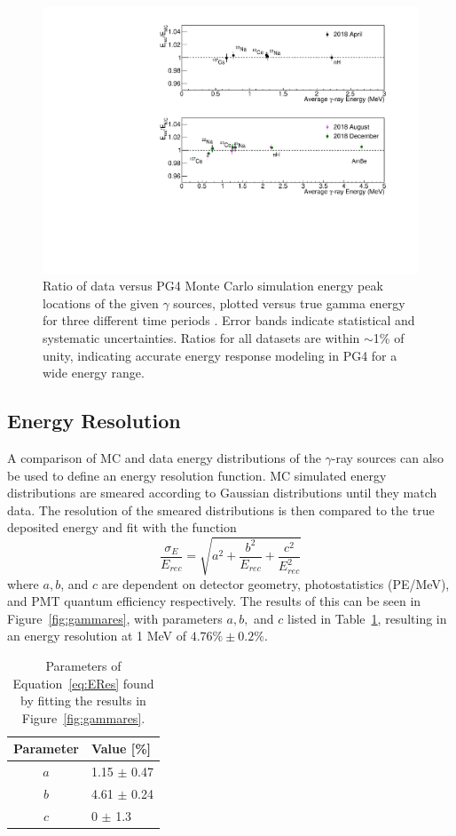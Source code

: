 \begin{figure}[h]
	\centering
	\includegraphics[width=0.7\linewidth]{tex/5-analysis-images/GammaScale}
	\caption[MC-data reconstructed energy peak ratio for $\gamma$ sources]{Ratio of data versus PG4 Monte Carlo simulation energy peak locations of the given $\gamma$ sources, plotted versus true gamma energy for three different time periods \cite{XZhang:2815}. Error bands indicate statistical and systematic uncertainties. Ratios for all datasets are within $\sim$1\% of unity, indicating accurate energy response modeling in PG4 for a wide energy range.}
	\label{fig:gammascale}
\end{figure}

\subsection{Energy Resolution}

A comparison of MC and data energy distributions of the $\gamma$-ray sources can also be used to define an energy resolution function. 
MC simulated energy distributions are smeared according to Gaussian distributions until they match data. 
The resolution of the smeared distributions is then compared to the true deposited energy and fit with the function
\begin{equation}
	\frac{\sigma_E}{E_{rec}} = \sqrt{a^2 + \frac{b^2}{E_{rec}} + \frac{c^2}{E^2_{rec}}}
	\label{eq:ERes}
\end{equation}
where $a, b$, and $c$ are dependent on detector geometry, photostatistics (PE/MeV), and PMT quantum efficiency respectively. 
The results of this can be seen in Figure~\ref{fig:gammares}, with parameters $a, b,$ and $c$ listed in Table~\ref{tab:MCResValues}, resulting in an energy resolution at 1 MeV of $4.76\%\pm0.2\%$.

\begin{table}[b]
	\centering
\begin{tabular}{c|l}
	\hline 
	\textbf{Parameter} & \textbf{Value [\%]} \\ 
	\hline 
	$a$ & 1.15 $\pm$ 0.47 \\ 
	$b$ & 4.61 $\pm$ 0.24 \\ 
	$c$ & 0 $\pm$ 1.3 \\ 
	\hline 
\end{tabular} 
\caption{Parameters of Equation~\ref{eq:ERes} found by fitting the results in Figure~\ref{fig:gammares}.}
\label{tab:MCResValues}
\end{table}


